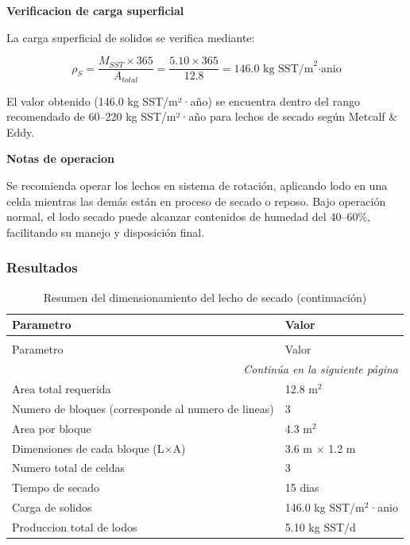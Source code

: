 \documentclass[12pt,a4paper]{article}
\begin{document}
\textbf{Verificacion de carga superficial}

La carga superficial de solidos se verifica mediante:

\begin{equation}
\rho_S = \frac{M_{SST} \times 365}{A_{total}} = \frac{5.10 \times 365}{12.8} = 146.0 \text{ kg SST/m}^2\text{·anio}
\end{equation}

El valor obtenido (146.0 kg SST/m²·año) se encuentra dentro del rango recomendado de 60--220 kg SST/m²·año para lechos de secado según Metcalf & Eddy.

\textbf{Notas de operacion}

Se recomienda operar los lechos en sistema de rotación, aplicando lodo en una celda mientras las demás están en proceso de secado o reposo. Bajo operación normal, el lodo secado puede alcanzar contenidos de humedad del 40--60\%, facilitando su manejo y disposición final.

\subsubsection{Resultados}

\begingroup
\small
\begin{longtable}{ll}
\caption{Resumen del dimensionamiento del lecho de secado}\\
\toprule
Parametro & Valor \\
\midrule
\endfirsthead
\caption[]{Resumen del dimensionamiento del lecho de secado (continuación)}\\
\toprule
Parametro & Valor \\
\midrule
\endhead
\midrule
\multicolumn{2}{r}{\textit{Continúa en la siguiente página}} \\
\endfoot
\bottomrule
\endlastfoot
Area total requerida & 12.8 m$^2$ \\
Numero de bloques (corresponde al numero de lineas) & 3 \\
Area por bloque & 4.3 m$^2$ \\
Dimensiones de cada bloque (L$\times$A) & 3.6 m $\times$ 1.2 m \\
Numero total de celdas & 3 \\
Tiempo de secado & 15 dias \\
Carga de solidos & 146.0 kg SST/m$^2$·anio \\
Produccion total de lodos & 5.10 kg SST/d \\
\end{longtable}
\endgroup
\end{document}
